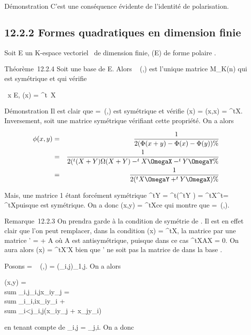 \documentclass[]{article}
\begin{document}
Démonstration C'est une conséquence évidente de l'identité de
polarisation.

\subsection{12.2.2 Formes quadratiques en dimension finie}

Soit E un K-espace vectoriel ~de dimension finie, \Phi \inQ(E) de forme
polaire \phi.

Théorème~12.2.4 Soit  une base de E. Alors
\mathrmMat~ (\phi,) est
l'unique matrice \Omega \in M_K(n) qui est symétrique et qui vérifie

\forall~x \in E, \Phi(x) = ^t~X\OmegaX

Démonstration Il est clair que \Omega =\
\mathrmMat (\Phi,) est symétrique et vérifie \Phi(x) =
\phi(x,x) = ^tX\OmegaX. Inversement, soit \Omega une matrice symétrique
vérifiant cette propriété. On a alors

\begin{align*} \phi(x,y)& =& 1 \over
2 (\Phi(x + y) - \Phi(x) - \Phi(y)) \%& \\ &
=& 1 \over 2 (^t(X + Y )\Omega(X + Y )
-^tX\OmegaX -^tY \OmegaY \%&
\\ & =& 1 \over 2
(^tX\OmegaY + ^tY \OmegaX) \%&
\\ \end{align*}

Mais, une matrice 1  étant forcément symétrique ^tY \OmegaX =
^t(^tY \OmegaX) = ^tX^t\OmegaY =
^tX\OmegaY puisque \Omega est symétrique. On a donc \phi(x,y) =
^tX\OmegaY ce qui montre que \Omega =\
\mathrmMat (\phi,).

Remarque~12.2.3 On prendra garde à la condition de symétrie de \Omega. Il est
en effet clair que l'on peut remplacer, dans la condition \Phi(x) =
^tX\OmegaX, la matrice \Omega par une matrice \Omega' = \Omega + A où A est
antisymétrique, puisque dans ce cas ^tXAX = 0. On aura alors
\Phi(x) = ^tX\Omega'X bien que \Omega' ne soit pas la matrice de \Phi dans la
base \mathcal{E}.

Posons \Omega = \mathrmMat~ (\phi,)
= (\omega_i,j)_1\leqi,j\leqn. On a alors

\phi(x,y) = \\sum
_i,j\omega_i,jx_iy_j =
\\sum
_i\omega_i,ix_iy_i +
\\sum
_i<j\omega_i,j(x_iy_j +
x_jy_i)

en tenant compte de \omega_i,j = \omega_j,i. On a donc
\end{document}
